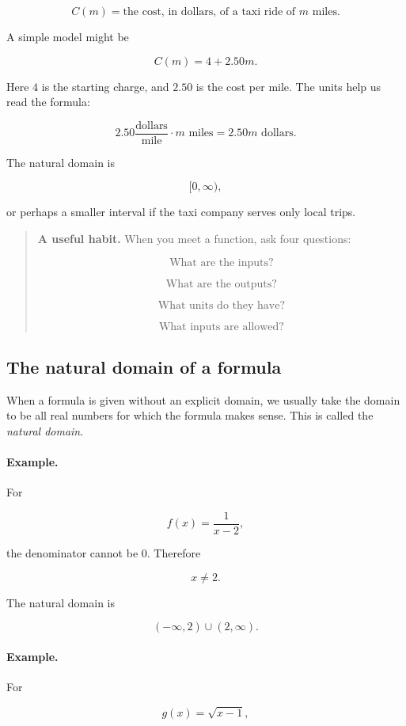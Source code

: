 \[
C(m)=\text{the cost, in dollars, of a taxi ride of }m\text{ miles}.
\]

A simple model might be

\[
C(m)=4+2.50m.
\]

Here \(4\) is the starting charge, and \(2.50\) is the cost per mile. The units help us read the formula:

\[
2.50\frac{\text{dollars}}{\text{mile}}\cdot m\text{ miles}
=
2.50m\text{ dollars}.
\]

The natural domain is

\[
[0,\infty),
\]

or perhaps a smaller interval if the taxi company serves only local trips.

\begin{quote}
\textbf{A useful habit.}
When you meet a function, ask four questions:

\[
\text{What are the inputs?}
\]

\[
\text{What are the outputs?}
\]

\[
\text{What units do they have?}
\]

\[
\text{What inputs are allowed?}
\]
\end{quote}

\subsection{The natural domain of a formula}
\label{subsec:natural-domain-formula}

When a formula is given without an explicit domain, we usually take the domain to be all real numbers for which the formula makes sense. This is called the \emph{natural domain}.

\paragraph{Example.}
For

\[
f(x)=\frac{1}{x-2},
\]

the denominator cannot be \(0\). Therefore

\[
x\neq 2.
\]

The natural domain is

\[
(-\infty,2)\cup(2,\infty).
\]

\paragraph{Example.}
For

\[
g(x)=\sqrt{x-1},
\]

